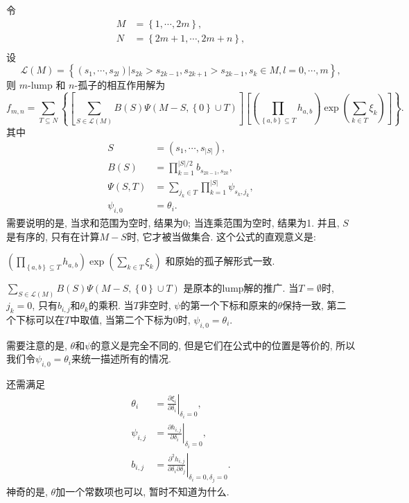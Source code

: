 \documentclass{article}
\newcommand{\sbrace}[1]{\left(#1\right)}
\newcommand{\mbrace}[1]{\left[#1\right]}
\newcommand{\bbrace}[1]{\left\{#1\right\}}
\newcommand{\eval}[2]{\left.{#1}\right|_{#2}}
\newcommand{\DIFF}[2]{\ensuremath{\frac{\partial #1}{\partial #2}}}
\begin{document}
令
\begin{equation}
\begin{aligned}
M&=\bbrace{1,\cdots,2m}, \\ 
N&=\bbrace{2m+1,\cdots,2m+n}, \\ 
\end{aligned}
\end{equation}
设
\begin{equation}
\mathcal{L}(M)=\bbrace{\sbrace{s_1,\cdots,s_{2l}}|s_{2k}>s_{2k-1},s_{2k+1}>s_{2k-1},s_k\in M,l=0,\cdots,m} , 
\end{equation}
则 $m$-lump 和 $n$-孤子的相互作用解为
\begin{equation}
f_{m,n}=\sum_{T\subseteq N}\bbrace{
  \mbrace{
    \sum_{S\in \mathcal{L}(M)}{
      B(S)
      \Psi\sbrace{M-S,\bbrace{0}\cup T}
    }
  }
  \mbrace{
    \sbrace{\prod_{\bbrace{a,b}\subseteq T}{h_{a,b}}}
    \exp\sbrace{\sum_{k\in T}{\xi_k}}
  }
}. 
\end{equation}
其中 
\begin{equation}
\begin{aligned}
S&=\sbrace{s_1,\cdots,s_{|S|}}, \\ 
B(S)&=\prod_{k=1}^{|S|/2}{b_{s_{2k-1},s_{2k}}},\\ 
\Psi(S,T)&=\sum_{j_k\in T}{\prod_{k=1}^{|S|}{\psi_{s_k,j_k}}}, \\ 
\psi_{i,0}&=\theta_i . 
\end{aligned}
\end{equation}
需要说明的是, 当求和范围为空时, 结果为0; 当连乘范围为空时, 结果为1. 并且, $S$是有序的, 只有在计算$M-S$时, 它才被当做集合. 这个公式的直观意义是:
\begin{compactitem}[\textbullet]
\item $\sbrace{\prod_{\bbrace{a,b}\subseteq T}{h_{a,b}}}\exp\sbrace{\sum_{k\in T}{\xi_k}}$ 和原始的孤子解形式一致.
\item $\sum_{S\in \mathcal{L}(M)}{B(S)\Psi\sbrace{M-S,\bbrace{0}\cup T}}$ 是原本的lump解的推广. 当$T=\emptyset$时, $j_k=0$, 只有$b_{i,j}$和$\theta_k$的乘积. 当$T$非空时, $\psi$的第一个下标和原来的$\theta$保持一致, 第二个下标可以在$T$中取值, 当第二个下标为0时, $\psi_{i,0}=\theta_i$. 
\item 需要注意的是, $\theta$和$\psi$的意义是完全不同的, 但是它们在公式中的位置是等价的, 所以我们令$\psi_{i,0}=\theta_i$来统一描述所有的情况. 
\end{compactitem}

还需满足 
\begin{equation}
\begin{aligned} 
\theta_i &= \eval{\DIFF{\xi_i}{\delta_i}}{\delta_i=0},\\ 
\psi_{i,j} &= \eval{\DIFF{h_{i,j}}{\delta_i}}{\delta_i=0} ,\\ 
b_{i,j} &= \eval{\frac{\partial^2 h_{i,j}}{\partial \delta_i \partial \delta_j}}{\delta_i=0,\delta_j=0} .
\end{aligned}
\end{equation}
神奇的是, $\theta$加一个常数项也可以, 暂时不知道为什么. 
\end{document}
